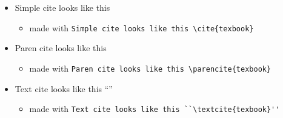 \documentclass[12pt,a4paper,dvipsnames]{article}
\begin{document}
\begin{itemize}
\begin{itemize}
  \end{itemize}
\item Simple cite looks like this \cite{texbook}
  \begin{itemize}
  \item made with {\color{PineGreen}\tt{}\lstinline#Simple cite looks like this \cite{texbook}#} 
  \end{itemize}
\item Paren cite looks like this \parencite{texbook}
  \begin{itemize}
  \item made with {\color{PineGreen}\tt{}\lstinline#Paren cite looks like this \parencite{texbook}#} 
  \end{itemize}
\item Text cite looks like this ``\textcite{texbook}''
  \begin{itemize}
  \item made with {\color{PineGreen}\tt{}\lstinline#Text cite looks like this ``\textcite{texbook}''#} 
  \end{itemize}
\end{itemize}
\clearpage
\printbibliography
\end{document}
